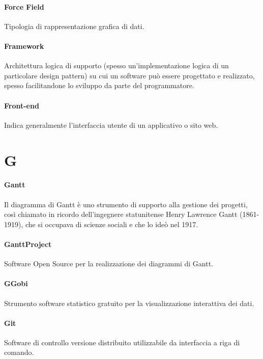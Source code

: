 \documentclass[]{article}
\begin{document}
	\paragraph*{Force Field}
	Tipologia di rappresentazione grafica di dati.
	
	\paragraph*{Framework}
	Architettura logica di supporto (spesso un'implementazione logica di un particolare design pattern) su cui un software può essere progettato e realizzato, spesso facilitandone lo sviluppo da parte del programmatore.
	
	\paragraph*{Front-end}
	Indica generalmente l'interfaccia utente di un applicativo o sito web.
	
	\newpage

	\section*{G}
	
	\paragraph*{Gantt}
	Il diagramma di Gantt è uno strumento di supporto alla gestione dei progetti, così chiamato in ricordo dell'ingegnere statunitense Henry Lawrence Gantt (1861-1919), che si occupava di scienze sociali e che lo ideò nel 1917.
	
	\paragraph*{GanttProject}
	Software Open Source per la realizzazione dei diagrammi di Gantt.
	
	\paragraph*{GGobi}
	Strumento software statistico gratuito per la visualizzazione interattiva dei dati.
	
	\paragraph*{Git}
	Software di controllo versione distribuito utilizzabile da interfaccia a riga di comando.
	
\end{document}
